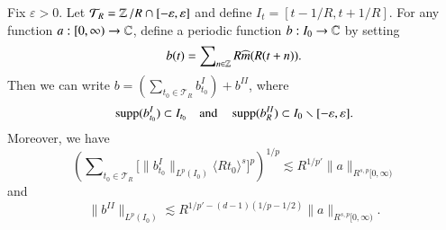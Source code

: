 \begin{lemma} \label{decompositionLemma}
    Fix $\varepsilon > 0$. Let $\mathcal{T}_R = \operatorname{\mathbb{Z}}/R \cap [-\varepsilon, \varepsilon]$ and define $I_t = [t - 1/R, t + 1/R]$. For any function $a: [0,\infty) \to \operatorname{\mathbb{C}}$, define a periodic function $b: I_0 \to \operatorname{\mathbb{C}}$ by setting
    \[ b(t) = \sum\nolimits_{n \in \operatorname{\mathbb{Z}}} R \widehat{m}(R(t + n)). \]
    Then we can write $b = \left( \sum\nolimits_{t_0 \in \mathcal{T}_R} b_{t_0}^I \right) + b^{II}$, where
    \[ \operatorname{\text{supp}}(b_{t_0}^I) \subset I_{t_0} \quad\text{and}\quad \operatorname{\text{supp}}(b_R^{II}) \subset I_0 \smallsetminus [-\varepsilon,\varepsilon]. \]
    Moreover, we have
    \[ \left( \sum\nolimits_{t_0 \in \mathcal{T}_R} \Big[ \| b^I_{t_0} \|_{L^p(I_0)} \langle R t_0 \rangle^{s} \Big]^p \right)^{1/p} \lesssim R^{1/p'} \| a \|_{R^{s,p}[0,\infty)} \]
        and
    \[ \| b^{II} \|_{L^p(I_0)} \lesssim R^{1/p' - (d-1)(1/p - 1/2)} \| a \|_{R^{s,p}[0,\infty)}. \]
\end{lemma}
